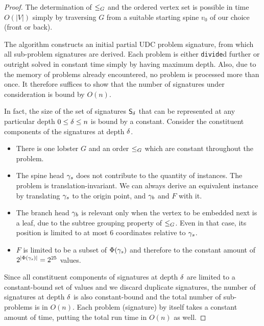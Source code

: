 \begin{proof}
The determination of $\leq_G$ and the ordered vertex set  is possible in time $O(|V|)$ simply by traversing $G$ from a suitable starting spine $v_0$ of our choice (front or back).

The algorithm constructs an initial partial UDC problem signature, from which all sub-problem signatures are derived. Each problem is either \texttt{divide}d further or outright solved in constant time simply by having maximum depth. Also, due to the memory of problems already encountered, no problem is processed more than once. It therefore suffices to show that the number of signatures under consideration is bound by $O(n)$.

In fact, the size of the set of signatures $\DataSty{S}_\depth$ that can be represented at any particular depth $0 \leq \delta \leq n$ is bound by a constant. Consider the constituent components of the signatures at depth $\delta$.

\begin{itemize}
    \item There is one lobster $G$ and an order $\leq_G$ which are constant throughout the problem.
    \item The spine head $\gamma_s$ does not contribute to the quantity of instances. The problem is translation-invariant. We can always derive an equivalent instance by translating $\gamma_s$ to the origin point, and $\gamma_b$ and $F$ with it.
    \item The branch head $\gamma_b$ is relevant only when the vertex to be embedded next is a leaf, due to the subtree grouping property of $\leq_G$. Even in that case, its position is limited to at most 6 coordinates relative to $\gamma_s$.
    \item $F$ is limited to be a subset of $\Phi(\gamma_s)$ and therefore to the constant amount of $2^{|\Phi(\gamma_s)|} = 2^{25}$ values.
\end{itemize}

Since all constituent components of signatures at depth $\delta$ are limited to a constant-bound set of values and we discard duplicate signatures, the number of signatures at depth $\delta$ is also constant-bound and the total number of sub-problems is in $O(n)$. Each problem (signature) by itself takes a constant amount of time, putting the total run time in $O(n)$ as well.
\end{proof}

